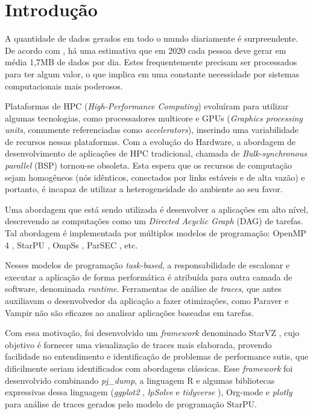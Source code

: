 \chapter{Introdução} \label{ch:intro}

A quantidade de dados gerados em todo o mundo diariamente é surpreendente. De acordo com \citet{ref:data_minute2}, há uma estimativa
que em 2020 cada pessoa deve gerar em média 1,7MB de dados por dia. Estes frequentemente precisam ser processados para ter algum valor,
o que implica em uma constante necessidade por sistemas computacionais mais poderosos.

Plataformas de HPC (\emph{High-Performance Computing}) evoluíram para utilizar algumas tecnologias, como processadores multicore e GPUs (\emph{Graphics processing units}, comumente referenciadas como \emph{accelerators}), inserindo uma variabilidade de recursos nessas plataformas. Com a evolução do Hardware, a abordagem de desenvolvimento de aplicações de HPC tradicional, chamada de \emph{Bulk-synchronous parallel} (BSP) tornou-se obsoleta. Esta espera que os recursos de computação sejam homogêneos (nós idênticos, conectados por links estáveis e de alta vazão) e portanto, é incapaz de utilizar a heterogeneidade do ambiente ao seu favor. 

Uma abordagem que está sendo utilizada é desenvolver a aplicações em alto nível, descrevendo as computações como um \emph{Directed Acyclic Graph} (DAG) de tarefas. Tal abordagem é implementada por múltiplos modelos de programação: OpenMP 4 \cite{ref:openmp4}, StarPU \cite{ref:starpu}, OmpSs \cite{ref:ompss}, ParSEC \cite{ref:parsec}, etc. 

Nesses modelos de programação \emph{task-based}, a responsabilidade de escalonar e executar a aplicação de forma performática é atribuída para outra camada de software, denominada \emph{runtime}. Ferramentas de análise de \emph{traces}, que antes auxiliavam o desenvolvedor da aplicação a fazer otimizações, como Paraver \cite{ref:paraver} e Vampir \cite{ref:vampir} não são eficazes ao analisar aplicações baseadas em tarefas.

Com essa motivação, foi desenvolvido um \emph{framework} denominado StarVZ \cite{ref:starvz}, cujo objetivo é fornecer uma visualização de traces mais elaborada, provendo facilidade no entendimento e identificação de problemas de performance sutis, que dificilmente seriam identificados com abordagens clássicas. Esse \emph{framework} foi desenvolvido combinando \emph{pj\_dump},  a linguagem R \cite{ref:rlanguage} e algumas bibliotecas expressivas dessa linguagem (\emph{ggplot2} \cite{ref:ggplot2}, \emph{lpSolve} \cite{ref:lpsolve} e \emph{tidyverse} \cite{ref:tidyverse}), Org-mode \cite{ref:org-mode} e \emph{plotly} para análise de traces gerados pelo modelo de programação StarPU. 

